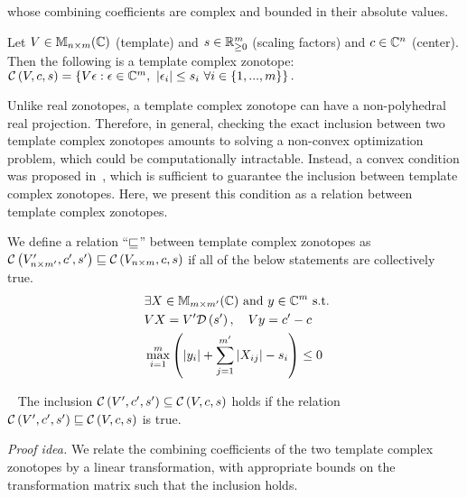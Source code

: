 whose combining coefficients are complex and bounded in their absolute
values.
%
\begin{definition}
Let $V\in\mat{n}{m}{\mb{C}}$ (template) and $s\in\mb{R}^m_{\geq 0}$ (scaling factors) and
$c\in\mb{C}^n$ (center).  Then the following is a template complex zonotope:
$\cz{V}{c}{s} =
\lt\{V\epsilon:\epsilon\in\mb{C}^m,~\lt|\epsilon_i\rt|\leq s_i~\forall
i\in\tup{m}\rt\}.$
\end{definition}
%
Unlike real zonotopes, a template complex zonotope can have a
non-polyhedral real projection.  Therefore, in general, checking the
exact inclusion between two template complex zonotopes amounts to
solving a non-convex optimization problem, which could be
computationally intractable.  Instead, a convex condition was proposed
in~\cite{tcz2017}, which is sufficient to guarantee the inclusion
between template complex zonotopes.  Here, we present this condition
as a relation between template complex zonotopes.  
%
\begin{definition}
We define a relation ``$\order$'' between template complex zonotopes
as\\ $\cz{V^\pr_{n\times m^\pr}}{c^\pr}{s^\pr}\order \cz{V_{n\times
    m}}{c}{s}$ if all of the below statements are collectively true.
\begin{align}~\label{eqn:tcz-inc}
\begin{split}
& \exists X\in\mat{m}{m^\pr}{\mb{C}}~\text{and}~y\in\mb{C}^{m}~\text{s.t.}\\
& \transfer{V}{V^\pr}{s^\pr}{X},~~~\centertransfer{V}{c}{c^\pr}{y}\\
& \scalebound{X}{y}{s}{m}{m^\pr}\leq 0\\
\end{split}
\end{align}
\end{definition}
%
\begin{lemma}~\label{lem:zon-zon} The
inclusion $\cz{V^\pr}{c^\pr}{s^\pr}\subseteq \cz{V}{c}{s}$ holds if
the relation $\cz{{V^\pr}}{c^\pr}{s^\pr}\order \cz{V}{c}{s}$ is true.
\end{lemma}
\emph{Proof idea.}
We relate the combining
coefficients of the two template complex zonotopes by a linear
transformation, with appropriate bounds on the transformation matrix
such that the inclusion holds.

